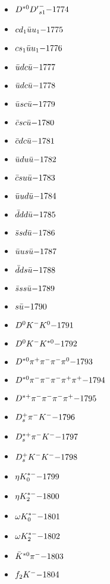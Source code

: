 \begin{multicols}{3}
\begin{itemize}
 \item $ D^{*0} {D^{\prime}}_{s1}^{-} \hfill{-1774}$
 \item $ cd_{1} \bar{u}u_{1} \hfill{-1775}$
 \item $ cs_{1} \bar{u}u_{1} \hfill{-1776}$
 \item $ \bar{u} d c \bar{u} \hfill{-1777}$
 \item $ \bar{u} d c \bar{u} \hfill{-1778}$
 \item $ \bar{u} s c \bar{u} \hfill{-1779}$
 \item $ \bar{c} s c \bar{u} \hfill{-1780}$
 \item $ \bar{c} d c \bar{u} \hfill{-1781}$
 \item $ \bar{u} d u \bar{u} \hfill{-1782}$
 \item $ \bar{c} s u \bar{u} \hfill{-1783}$
 \item $ \bar{u} u d \bar{u} \hfill{-1784}$
 \item $ \bar{d} d d \bar{u} \hfill{-1785}$
 \item $ \bar{s} s d \bar{u} \hfill{-1786}$
 \item $ \bar{u} u s \bar{u} \hfill{-1787}$
 \item $ \bar{d} d s \bar{u} \hfill{-1788}$
 \item $ \bar{s} s s \bar{u} \hfill{-1789}$
 \item $ s \bar{u} \hfill{-1790}$
 \item $ D^{0} K^{-} K^{0} \hfill{-1791}$
 \item $ D^{0} K^{-} K^{*0} \hfill{-1792}$
 \item $ D^{*0} \pi^{+} \pi^{-} \pi^{-} \pi^{0} \hfill{-1793}$
 \item $ D^{*0} \pi^{-} \pi^{-} \pi^{-} \pi^{+} \pi^{+} \hfill{-1794}$
 \item $ D^{*+} \pi^{-} \pi^{-} \pi^{-} \pi^{+} \hfill{-1795}$
 \item $ D_{s}^{+} \pi^{-} K^{-} \hfill{-1796}$
 \item $ D_{s}^{*+} \pi^{-} K^{-} \hfill{-1797}$
 \item $ D_{s}^{+} K^{-} K^{-} \hfill{-1798}$
 \item $ \eta K_{0}^{*-} \hfill{-1799}$
 \item $ \eta K_{2}^{*-} \hfill{-1800}$
 \item $ \omega K_{0}^{*-} \hfill{-1801}$
 \item $ \omega K_{2}^{*-} \hfill{-1802}$
 \item $ \bar{K}^{*0} \pi^{-} \hfill{-1803}$
 \item $ f_{2} K^{-} \hfill{-1804}$

\end{itemize}
\end{multicols}
